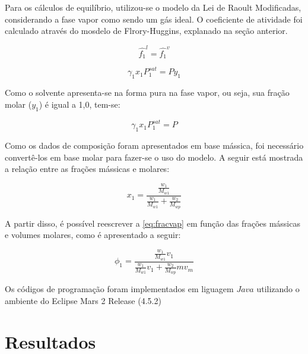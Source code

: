Para os cálculos de equilíbrio, utilizou-se o modelo da Lei de Raoult
Modificadas, considerando a fase vapor como sendo um gás ideal. O coeficiente de
atividade foi calculado através do mosdelo de Flrory-Huggins, explanado na seção
anterior.

\begin{equation}
\hat{f_1}^l = \hat{f_1}^v
\end{equation}

\begin{equation}
\gamma_1x_1P_1^{sat} = Py_1
\end{equation}

Como o solvente apresenta-se na forma pura na fase vapor, ou seja, sua fração
molar ($y_1$) é igual a 1,0, tem-se:

\begin{equation}
\gamma_1x_1P_1^{sat} = P
\end{equation}

Como os dados de composição foram apresentados em base mássica, foi necessário
convertê-los em base molar para fazer-se o uso do modelo. A seguir está mostrada
a relação entre as frações mássicas e molares:

\begin{equation}
x_1
=\frac{\displaystyle
\frac{w_1}{M_{w1}}}{\displaystyle\frac{w_1}{M_{w1}}+\frac{w_2}{M_{wp}}}
\end{equation}

A partir disso, é possível reescrever a \autoref{eq:fracvap} em função das
frações mássicas e volumes molares, como é apresentado a seguir:

\begin{equation}
\phi_1 =
\frac{\displaystyle\frac{w_1}{M_{w1}}v_1}{\displaystyle\frac{w_1}{M_{w1}}v_1+\displaystyle\frac{w_2}{M_{wp}}mv_m}
\end{equation}

Os códigos de programação foram implementados em
liguagem $Java$ utilizando o ambiente do Eclipse Mars 2 Release (4.5.2)

\clearpage

\section{Resultados}


